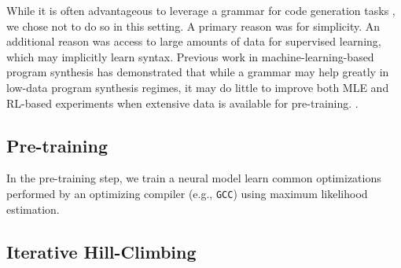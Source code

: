 \documentclass{article}
\begin{document}
 

 
While it is often advantageous to leverage a grammar for code generation tasks \citep{parisotto2016neuro,yin-neubig-2017-syntactic}, we chose not to do so in this setting. A primary reason was for simplicity. An additional reason was access to large amounts of data for supervised learning, which may implicitly learn syntax. Previous work in machine-learning-based program synthesis has demonstrated that while a grammar may help greatly in low-data program synthesis regimes, it may do little to improve both MLE and RL-based experiments when extensive data is available for pre-training. 
\cite{bunel2018leveraging}.

\subsection{Pre-training}

In the pre-training step, we train a neural model learn common optimizations performed by an optimizing compiler (e.g., \texttt{GCC}) using maximum likelihood estimation. 



\subsection{Iterative Hill-Climbing}
\end{document}
